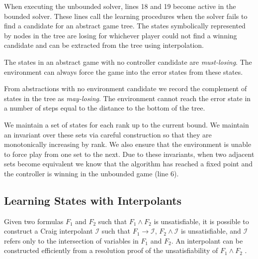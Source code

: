 \documentclass{llncs}
\begin{document}
When executing the unbounded solver, lines 18 and 19 become active in the
bounded solver. These lines call the learning procedures when the solver fails
to find a candidate for an abstract game tree. The states symbolically
represented by nodes in the tree are losing for whichever player could not find
a winning candidate and can be extracted from the tree using interpolation.

The states in an abstract game with no controller candidate are
\emph{must-losing}. The environment can always force the game into the error
states from these states.

From abstractions with no environment candidate we record the complement of
states in the tree as \emph{may-losing}. The environment cannot reach the error
state in a number of steps equal to the distance to the bottom of the tree.

We maintain a set of states for each rank up to the current bound. We maintain
an invariant over these sets via careful construction so that they are
monotonically increasing by rank. We also ensure that the environment is unable
to force play from one set to the next. Due to these invariants, when two
adjacent sets become equivalent we know that the algorithm has reached a fixed
point and the controller is winning in the unbounded game (line 6).



\subsection{Learning States with Interpolants}

Given two formulas $F_1$ and $F_2$ such that $F_1 \land F_2$ is unsatisfiable,
it is possible to construct a Craig interpolant\cite{craig1957} $\mathcal{I}$
such that $F_1 \to \mathcal{I}$, $F_2 \land \mathcal{I}$ is unsatisfiable, and
$\mathcal{I}$ refers only to the intersection of variables in $F_1$ and $F_2$.
An interpolant can be constructed efficiently from a resolution proof of the
unsatisfiability of $F_1 \land F_2$ \cite{pudlak1997}.
\end{document}
